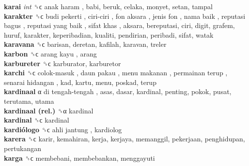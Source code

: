 \textbf{karai} \emph{int}  ␝ϲ   anak haram , babi, beruk, celaka, monyet, setan, tampal  \\
\textbf{karakter} ␝ϲ   budi pekerti ,  ciri-ciri ,  fon aksara ,  jenis fon ,  nama baik ,  reputasi bagus ,  reputasi yang baik ,  sifat khas , aksara, bereputasi, ciri, digit, grafem, huruf, karakter, keperibadian, kualiti, pendirian, peribadi, sifat, watak  \\
\textbf{karavana} ␝ϲ  barisan, deretan, kafilah, karavan, treler  \\
\textbf{karbon} ␝ϲ   arang kayu , arang  \\
\textbf{karbureter} ␝ϲ  karburator, karburetor  \\
\textbf{karchi} ␝ϲ   colok-masuk ,  daun pakau ,  menu makanan ,  permainan terup ,  senarai hidangan , kad, kartu, menu, poskad, terup  \\
\textbf{kardinaal} α   di tengah-tengah , asas, dasar, kardinal, penting, pokok, pusat, terutama, utama  \\
\textbf{kardinaal (rel.)} ␝α  kardinal  \\
\textbf{kardinal} ␝ϲ  kardinal  \\
\textbf{kardiólogo} ␝ϲ   ahli jantung , kardiolog  \\
\textbf{karera} ␝ϲ  karir, kemahiran, kerja, kerjaya, memanggil, pekerjaan, penghidupan, pertukangan  \\
\textbf{karga} ␝ϲ  membebani, membebankan, menggayuti  \\
